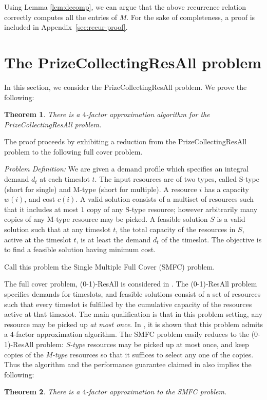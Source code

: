 \documentclass[11pt]{article}
\newtheorem{theorem}{Theorem}
\newcommand{\ZeroOneResAll} {{\sc (0-1)-ResAll}}
\newcommand{\PCResAll}{{\sc PrizeCollectingResAll}}
\newcommand{\smfc}{{\sc SMFC}}
\begin{document}
Using Lemma \ref{lem:decomp}, we can argue that the above recurrence relation correctly computes
all the entries of $M$. 
For the sake of completeness, a proof is included in Appendix~\ref{sec:recur-proof}.

\section{The {\PCResAll} problem}
\label{app:pcresall}
In this section, we consider the {\PCResAll} problem. We prove the following:

\begin{theorem}
\label{DDD}
There is a $4$-factor approximation algorithm for the {\PCResAll} problem. 
\end{theorem}
The proof proceeds by exhibiting a reduction from the {\PCResAll} problem to 
the following full cover problem.

\noindent
{\it  Problem Definition:} We are given a demand profile which specifies an integral demand $d_t$ at each timeslot $t$.
The input resources are of two types, called S-type (short for single) and M-type (short for multiple).  
A resource $i$ has 
a capacity $w(i)$, and cost $c(i)$. A valid solution consists of a multiset of resources such that
it includes at most $1$ copy of any S-type resource; however arbitrarily many copies of any M-type resource may be picked. A feasible solution $S$ is a valid solution such that at any timeslot $t$, the total 
capacity of the resources in $S$, active at the timeslot $t$, is at least the demand $d_t$ of the timeslot.
The objective is to find a feasible solution having minimum cost. 

Call this problem the Single Multiple Full Cover ({\smfc}) problem.

The full cover problem, {\ZeroOneResAll} is considered in \cite{esa2011}. 
The {\ZeroOneResAll} problem specifies demands for 
timeslots, and feasible solutions consist of a set of resources such that every timeslot is 
fulfilled by the cumulative capacity of the resources active at that timeslot. The main 
qualification is that in this problem setting, any resource may be picked up {\em at most
once}. In \cite{esa2011},  it is shown that this problem admits a $4$-factor
approximation algorithm. The {\smfc} problem easily reduces to the {\ZeroOneResAll} problem:
{\em S-type} resources may be picked up at most once, and keep copies of the {\em M-type}
resources so that it suffices to select any one of the copies. 
Thus the algorithm and the performance guarantee claimed in \cite{esa2011} also implies the following:
\begin{theorem}\label{EEE}
There is a $4$-factor approximation to the {\smfc} problem. 
\end{theorem} 
\end{document}
